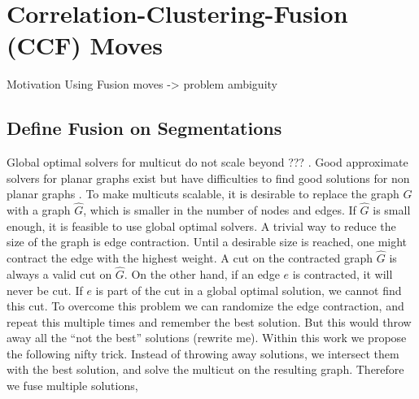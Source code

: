 \documentclass[10pt,twocolumn,letterpaper]{article}
\begin{document}



\section{Correlation-Clustering-Fusion (CCF) Moves}\label{sec:cc_fm}
Motivation Using Fusion moves -> problem ambiguity





\subsection{Define Fusion on Segmentations}



Global optimal solvers for multicut do not scale beyond ??? \cite{???}.
Good approximate solvers for planar graphs exist \cite{beier_2014_cvpr,yarkony_2012_eccv} 
but have difficulties to find good solutions for non planar graphs \cite{beier_2014_cvpr}.
%
To make multicuts scalable, it is desirable to replace the graph $G$
with a graph $\hat{G}$, which is smaller in the number of nodes and edges. 
If $\hat{G}$ is small enough, it is feasible to use global optimal solvers.
%
A trivial way to reduce the size of the graph  is edge contraction.
Until a desirable size is reached, one might contract the edge with
the highest weight. A cut on the contracted graph  $\hat{G}$ is always
a valid cut on $\hat{G}$.
%
On the other hand, if an edge $e$ is contracted, it will never be cut.
If $e$ is part of the cut in a global optimal solution, we cannot find
this cut.
%
To overcome this problem  we can randomize the edge contraction,
and repeat this multiple times and remember the best solution.
%
But this would throw away all the ``not the best'' solutions (rewrite me).
Within this work we propose the following nifty trick.
Instead of throwing away solutions, we intersect them with the 
best solution, and solve the multicut on the resulting
graph.
Therefore we fuse multiple solutions,
\end{document}
